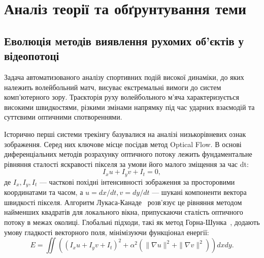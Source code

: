 \section{Аналіз теорії та обґрунтування теми}

\subsection{Еволюція методів виявлення рухомих об'єктів у відеопотоці}
Задача автоматизованого аналізу спортивних подій високої динаміки, до яких належить волейбольний матч, висуває
екстремальні вимоги до систем комп'ютерного зору. Траєкторія руху волейбольного м'яча характеризується високими
швидкостями, різкими змінами напрямку під час ударних взаємодій та суттєвими оптичними спотвореннями.

Історично перші системи трекінгу базувалися на аналізі низькорівневих ознак зображення. Серед них ключове місце
посідав метод Optical Flow. В основі диференціальних методів розрахунку оптичного потоку лежить
фундаментальне рівняння сталості яскравості пікселя за умови його малого зміщення за час dt:
\begin{equation}I_x u + I_y v + I_t = 0, \end{equation} де $I_x, I_y, I_t$ — часткові похідні інтенсивності зображення за
просторовими координатами та часом, а $u = dx/dt, v = dy/dt$ — шукані компоненти вектора швидкості пікселя. Алгоритм
Лукаса-Канаде~\cite{lucas_kanade1981,nayar_cv_lectures} розв'язує це рівняння методом найменших квадратів для локального вікна, припускаючи сталість оптичного
потоку в межах околиці. Глобальні підходи, такі як метод Горна-Шунка~\cite{horn_schunck1981}, додають умову гладкості векторного поля,
мінімізуючи функціонал енергії:
\begin{equation}E = \iint \left( (I_x u + I_y v + I_t)^2 + \alpha^2 (\| \nabla u\|^2 + \| \nabla v\|^2) \right) dx dy. \end{equation}


